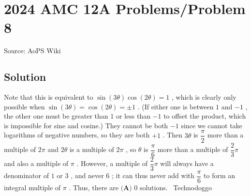\documentclass[12pt]{article}
\begin{document}
\section*{{2024 AMC 12A Problems/Problem 8}}
Source: AoPS Wiki

\subsection*{Solution}
Note that this is equivalent to $\sin(3\theta)\cos(2\theta)=1$ , which is clearly only possible when $\sin(3\theta)=\cos(2\theta)=\pm1$ . (If either one is between $1$ and $-1$ , the other one must be greater than $1$ or less than $-1$ to offset the product, which is impossible for sine and cosine.) They cannot be both $-1$ since we cannot take logarithms of negative numbers, so they are both $+1$ . Then $3\theta$ is $\dfrac\pi2$ more than a multiple of $2\pi$ and $2\theta$ is a multiple of $2\pi$ , so $\theta$ is $\dfrac\pi6$ more than a multiple of $\dfrac23\pi$ and also a multiple of $\pi$ . However, a multiple of $\dfrac23\pi$ will always have a denominator of $1$ or $3$ , and never $6$ ; it can thus never add with $\dfrac\pi6$ to form an integral multiple of $\pi$ . Thus, there are $\boxed{\textbf{(A) }0}$ solutions. ~Technodoggo
\end{document}
